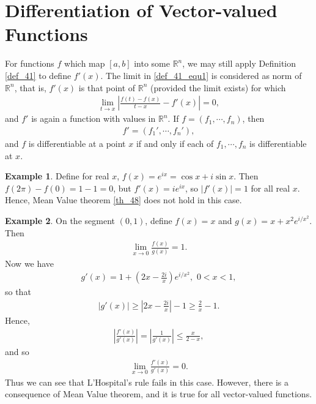 \documentclass[11pt]{book}
\theoremstyle{definition}
\newtheorem{example}{Example}[chapter]
\numberwithin{equation}{chapter}
\begin{document}
\medskip


\section{Differentiation of Vector-valued Functions} 
For functions $f$ which map $[a,b]$ into some $\mathbb{R}^n$, we may still apply Definition \ref{def_41} to define $f'(x)$. The limit in \ref{def_41_equ1} is considered as norm of $\mathbb{R}^n$, that is, $f'(x)$ is that point of $\mathbb{R}^n$ (provided the limit exists) for which \begin{align*}
    \lim_{t \to x} \left|\frac{f(t) - f(x)}{t - x} - f'(x)\right| = 0,
\end{align*}
and $f'$ is again a function with values in $\mathbb{R}^n$. If $f = (f_1, \cdots, f_n)$, then
\begin{align*}
    f' = (f_1', \cdots, f_n'),
\end{align*}
and $f$ is differentiable at a point $x$ if and only if each of $f_1, \cdots, f_n$ is differentiable at $x$.

\medskip

\begin{example}
Define for real $x$, $f(x) = e^{ix} = \cos x + i \sin x$. Then $f(2\pi) - f(0) = 1 - 1 = 0$, but $f'(x) = i e^{ix}$, so $\left|f'(x)\right| = 1$ for all real $x$. Hence, Mean Value theorem \ref{th_48} does not hold in this case.
\end{example}

\medskip

\begin{example}
On the segment $(0,1)$, define $f(x) = x$ and $g(x) = x + x^2 e^{i/x^2}$. Then
\begin{align*}
    \lim_{x \to 0} \frac{f(x)}{g(x)} = 1.
\end{align*}
Now we have
\begin{align*}
    g'(x) = 1 + \left(2x - \frac{2i}{x}\right) e^{i/x^2}, \,\, 0 < x < 1,
\end{align*}
so that
\begin{align*}
    \left|g'(x)\right| \geq \left|2x - \frac{2i}{x}\right| - 1 \geq \frac{2}{x} - 1.
\end{align*}
Hence,
\begin{align*}
    \left|\frac{f'(x)}{g'(x)}\right| = \left| \frac{1}{g'(x)} \right| \leq \frac{x}{2 - x},
\end{align*}
and so
\begin{align*}
    \lim_{x \to 0} \frac{f'(x)}{g'(x)} = 0.
\end{align*}
Thus we can see that L'Hospital's rule fails in this case. However, there is a consequence of Mean Value theorem, and it is true for all vector-valued functions.
\end{example}
\end{document}
